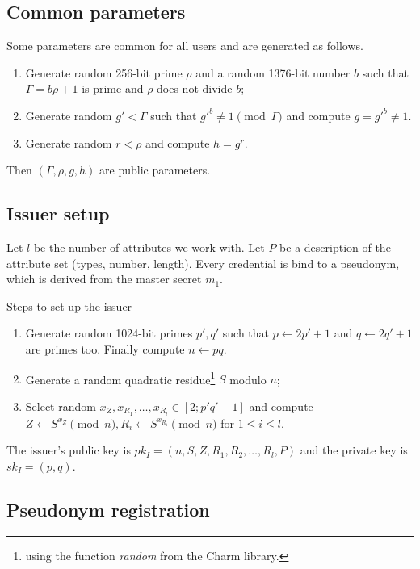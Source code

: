 \documentclass[a4paper]{article}
\begin{document}
\subsection{Common parameters}

Some parameters are common for all users and are generated as follows.
\begin{enumerate}
\item Generate random 256-bit prime $\rho$ and a random 1376-bit number $b$ such that
$\Gamma = b\rho+1$ is prime and $\rho$ does not divide $b$;
\item Generate random $g'< \Gamma$ such that
$g'^{b}\neq 1\pmod{\Gamma}$ and compute $g = g'^{b}\neq 1$.
\item Generate random $r<\rho$ and compute $h = g^r$.
\end{enumerate}
Then $(\Gamma,\rho,g,h)$ are public parameters.

\subsection{Issuer setup}\label{sec:iss-setup}

Let $l$ be the number of attributes we work with.  Let $P$ be a description of the 
attribute set (types, number, length).  Every credential is bind to a pseudonym, which is derived from the master secret
$m_1$.


Steps to set up the issuer
\begin{enumerate}
\item Generate random 1024-bit primes $p',q'$ such that  $p \leftarrow 2p'+1$ and $q \leftarrow 2q'+1$ are primes too. Finally compute $n \leftarrow pq$.
    \item Generate a random quadratic residue\footnote{using the function \textsl{random} from the Charm library.} $S$ modulo $n$;
    \item Select random $x_Z, x_{R_1},\ldots , x_{R_l}\in [2; p'q'-1]$ and
compute $Z \leftarrow S^{x_Z}\pmod{n} , R_i \leftarrow S^{x_{R_i}}\pmod{n}$ for $1\leq i \leq l$.
\end{enumerate}
The issuer's public key is $pk_I = (n, S,Z,R_1,R_2,\ldots,R_l,P)$ and the private key is $sk_I = (p, q)$.

\subsection{Pseudonym registration}
\end{document}
